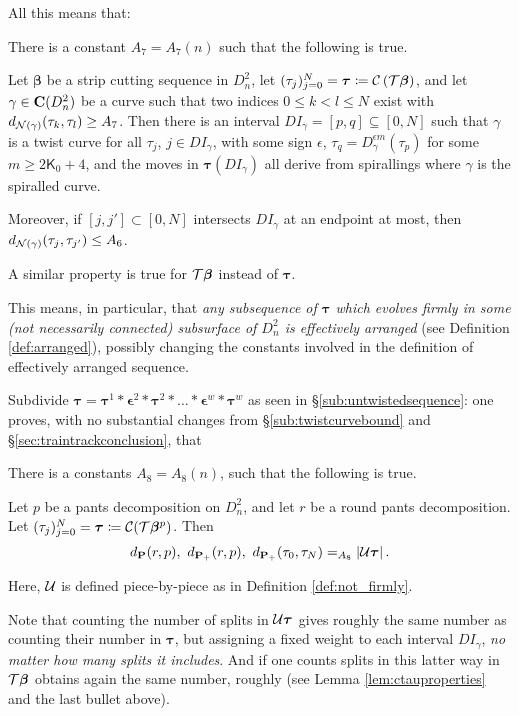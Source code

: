 All this means that:
\begin{lemma}
There is a constant $A_7=A_7(n)$ such that the following is true.

Let $\bm\beta$ be a strip cutting sequence in $D^2_n$, let $(\tau_j)_{j=0}^N=\bm\tau\coloneqq {\mathcal C}\left({\mathcal T}\bm\beta\right)$, and let $\gamma\in\mathbf C(D^2_n)$ be a curve such that two indices $0\leq k<l\leq N$ exist with $d_{{\mathcal N}(\gamma)}(\tau_k,\tau_l)\geq A_7$. Then there is an interval $DI_\gamma=[p,q]\subseteq [0,N]$ such that $\gamma$ is a twist curve for all $\tau_j$, $j\in DI_\gamma$, with some sign $\epsilon$, $\tau_q=D_\gamma^{\epsilon m}(\tau_p)$ for some $m\geq 2\mathsf K_0+4$, and the moves in $\bm\tau(DI_\gamma)$ all derive from spirallings where $\gamma$ is the spiralled curve.

Moreover, if $[j,j']\subset [0,N]$ intersects $DI_\gamma$ at an endpoint at most, then\linebreak $d_{{\mathcal N}(\gamma)}(\tau_j,\tau_{j'})\leq A_6$.

A similar property is true for ${\mathcal T}\bm\beta$ instead of $\bm\tau$.
\end{lemma}

This means, in particular, that \emph{any subsequence of $\bm\tau$ which evolves firmly in some (not necessarily connected) subsurface of $D^2_n$ is effectively arranged} (see Definition \ref{def:arranged}), possibly changing the constants involved in the definition of effectively arranged sequence.

Subdivide $\bm\tau= \bm\tau^1*\bm\epsilon^2*\bm\tau^2*\ldots*\bm\epsilon^w*\bm\tau^w$ as seen in \S \ref{sub:untwistedsequence}: one proves, with no substantial changes from \S \ref{sub:twistcurvebound} and \S \ref{sec:traintrackconclusion}, that
\begin{claim}
There is a constants $A_8=A_8(n)$, such that the following is true.

Let $p$ be a pants decomposition on $D^2_n$, and let $r$ be a round pants decomposition. Let $(\tau_j)_{j=0}^N=\bm\tau\coloneqq{\mathcal C}({\mathcal T}\bm\beta^p)$. Then
$$
d_{\pc}(r,p),\ d_{\pa}(r,p),\ d_{\pa}(\tau_0,\tau_N)=_{A_8} \left|\utw\bm\tau\right|.
$$

Here, ${\mathcal U}$ is defined piece-by-piece as in Definition \ref{def:not_firmly}.
\end{claim}

Note that counting the number of splits in ${\mathcal U}\bm\tau$ gives roughly the same number as counting their number in $\bm\tau$, but assigning a fixed weight to each interval $DI_\gamma$, \emph{no matter how many splits it includes}. And if one counts splits in this latter way in ${\mathcal T}\bm\beta$ obtains again the same number, roughly (see Lemma \ref{lem:ctauproperties} and the last bullet above).

